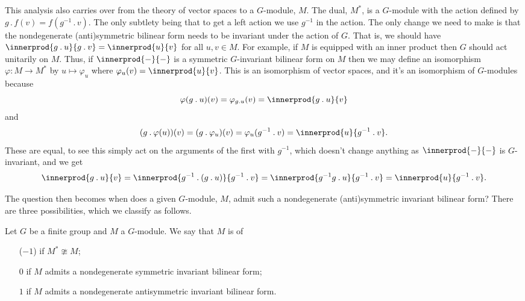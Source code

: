 \documentclass[fleqn]{NotesClass}
\newcommand{\action}{\mathbin{.}}
\begin{document}
    This analysis also carries over from the theory of vector spaces to a \(G\)-module, \(M\).
    The dual, \(M^*\), is a \(G\)-module with the action defined by \(g \action f(v) = f(g^{-1} \action v)\).
    The only subtlety being that to get a left action we use \(g^{-1}\) in the action.
    The only change we need to make is that the nondegenerate (anti)symmetric bilinear form needs to be invariant under the action of \(G\).
    That is, we should have \(\innerprod{g \action u}{g \action v} = \innerprod{u}{v}\) for all \(u, v \in M\).
    For example, if \(M\) is equipped with an inner product then \(G\) should act unitarily on \(M\).
    Thus, if \(\innerprod{-}{-}\) is a symmetric \(G\)-invariant bilinear form on \(M\) then we may define an isomorphism \(\varphi \colon M \to M^*\) by \(u \mapsto \varphi_u\) where \(\varphi_u(v) = \innerprod{u}{v}\).
    This is an isomorphism of vector spaces, and it's an isomorphism of \(G\)-modules because
    \begin{equation}
        \varphi(g \action u)(v) = \varphi_{g \action u}(v) = \innerprod{g \action u}{v}
    \end{equation}
    and
    \begin{equation}
        (g \action \varphi(u))(v) = (g \action \varphi_u)(v) = \varphi_u(g^{-1} \action v) = \innerprod{u}{g^{-1} \action v}.
    \end{equation}
    These are equal, to see this simply act on the arguments of the first with \(g^{-1}\), which doesn't change anything as \(\innerprod{-}{-}\) is \(G\)-invariant, and we get
    \begin{equation}
        \innerprod{g \action u}{v} = \innerprod{g^{-1} \action (g \action u)}{g^{-1} \action v} = \innerprod{g^{-1}g \action u}{g^{-1} \action v} = \innerprod{u}{g^{-1} \action v}.
    \end{equation}
    
    The question then becomes when does a given \(G\)-module, \(M\), admit such a nondegenerate (anti)symmetric invariant bilinear form?
    There are three possibilities, which we classify as follows.
    
    \begin{dfn}{}{}
        Let \(G\) be a finite group and \(M\) a \(G\)-module.
        We say that \(M\) is of
        \begin{enumerate}
            \item[(\(-1\))]  if \(M^* \ncong M\);
            \item[\(0\)]  if \(M\) admits a nondegenerate symmetric invariant bilinear form;
            \item[\(1\)]  if \(M\) admits a nondegenerate antisymmetric invariant bilinear form.
        \end{enumerate}
    \end{dfn}
    
\end{document}
